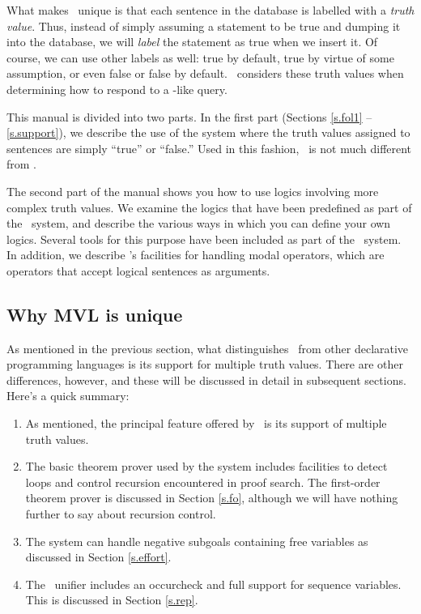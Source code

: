 What makes \mvl\ unique is that each sentence in the database is
labelled with a {\em truth value\/}.  Thus,
instead of simply assuming a statement to be true and dumping it into
the database, we will {\em label\/} the statement as true when we
insert it.  Of course, we can use other labels as well: true by
default, true by virtue of some assumption, or even false or false by
default.  \Mvl\ considers these truth values when determining how to
respond to a \prolog-like query.

This manual is divided into two parts.  In the first part (Sections
\ref{s.fol1} -- \ref{s.support}), we describe the use of the system
where the truth values assigned to sentences are simply ``true'' or
``false.''  Used in this fashion, \mvl\ is not much different from
\prolog.

The second part of the manual shows you how to use logics involving
more complex truth values.  We examine the logics that have been
predefined as part of the \mvl\ system, and describe the various ways
in which you can define your own logics.  Several tools for this
purpose have been included as part of the \mvl\ system.  In addition,
we describe \mvl's facilities for handling modal operators, which
are operators that accept logical sentences as arguments.

\subsection{Why MVL is unique}

As mentioned in the previous section, what distinguishes \mvl\ from
other declarative programming languages is its support for multiple
truth values.  There are other differences, however, and these will
be discussed in detail in subsequent sections.  Here's a quick summary:
 \begin{enumerate}
 \item As mentioned, the principal feature offered by \mvl\ is its
support of multiple truth values.
 \item The basic theorem prover used by the system includes facilities
to detect loops and control recursion encountered in proof search.
The first-order theorem prover is discussed in Section \ref{s.fo},
although we will have nothing further to say about recursion control.
 \item The system can handle negative subgoals containing free variables
as discussed in Section \ref{s.effort}.
 \item The \mvl\ unifier includes an occurcheck and full support for
sequence variables.  This is discussed in Section \ref{s.rep}.
 \end{enumerate}

